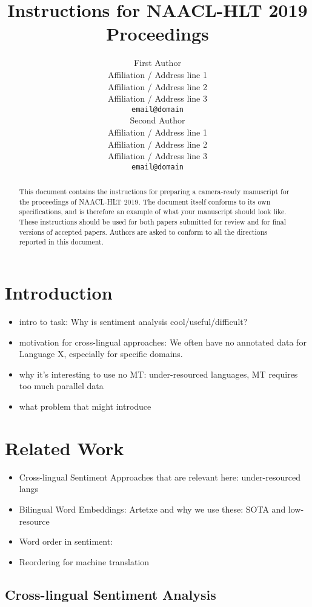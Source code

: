 \documentclass[11pt,a4paper]{article}
\title{Instructions for NAACL-HLT 2019 Proceedings}
\author{First Author \\
  Affiliation / Address line 1 \\
  Affiliation / Address line 2 \\
  Affiliation / Address line 3 \\
  {\tt email@domain} \\\And
  Second Author \\
  Affiliation / Address line 1 \\
  Affiliation / Address line 2 \\
  Affiliation / Address line 3 \\
  {\tt email@domain} \\}
\date{}
\begin{document}
\maketitle
\begin{abstract}
  This document contains the instructions for preparing a camera-ready
  manuscript for the proceedings of NAACL-HLT 2019. The document itself
  conforms to its own specifications, and is therefore an example of
  what your manuscript should look like. These instructions should be
  used for both papers submitted for review and for final versions of
  accepted papers.  Authors are asked to conform to all the directions
  reported in this document.
\end{abstract}


\section{Introduction}

\begin{itemize}
\item intro to task: Why is sentiment analysis cool/useful/difficult?
\item motivation for cross-lingual approaches: We often have no annotated data for Language X, especially for specific domains.
\item why it's interesting to use no MT: under-resourced languages, MT requires too much parallel data
\item what problem that might introduce
\end{itemize}

\section{Related Work}

\begin{itemize}

\item Cross-lingual Sentiment Approaches that are relevant here: under-resourced langs
\item Bilingual Word Embeddings: Artetxe and why we use these: SOTA and low-resource
\item Word order in sentiment:
\item Reordering for machine translation
\end{itemize}

\subsection{Cross-lingual Sentiment Analysis}
\end{document}
